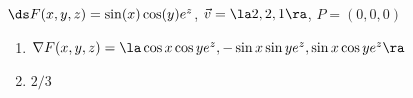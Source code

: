 {$\ds F(x,y,z) = \sin(x)\cos(y)e^z$, $\vec v = \la 2,2,1\ra$, $P = (0,0,0)$
}
{
\begin{enumerate}
	\item $\nabla F(x,y,z) = \la \cos x\cos ye^z, -\sin x\sin ye^z, \sin x\cos ye^z\ra$
	\item	$2/3$
\end{enumerate}
}